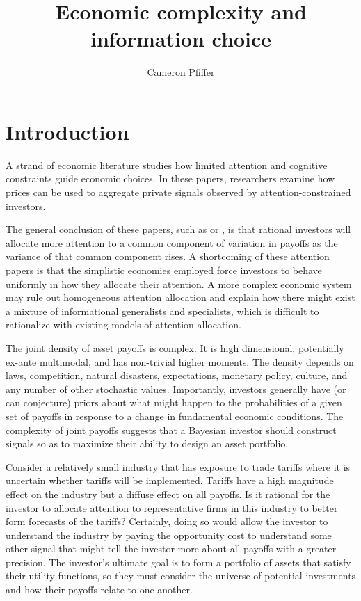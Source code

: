 \documentclass{article}
\title{Economic complexity and information choice}
\author{Cameron Pfiffer}
\begin{document}
\newcommand{\Gauss}{\mathcal{N}}
\newcommand{\Var}{\text{Var}}
\newcommand{\E}{\text{E}}
\newcommand{\argmax}{\text{argmax}}

\newtheorem{definition}{Definition}
\newtheorem{lemma}{Lemma}


\newpage

\maketitle

\section{Introduction}

A strand of economic literature studies how limited attention and cognitive constraints guide economic choices. In these papers, researchers examine how prices can be used to aggregate private signals observed by attention-constrained investors. 

The general conclusion of these papers, such as \textcite{kacperczyk_rational_2016} or \textcite{peng_investor_2006}, is that rational investors will allocate more attention to a common component of variation in payoffs as the variance of that common component rises. A shortcoming of these attention papers is that the simplistic economies employed force investors to behave uniformly in how they allocate their attention. A more complex economic system may rule out homogeneous attention allocation and explain how there might exist a mixture of informational generalists and specialists, which is difficult to rationalize with existing models of attention allocation.

The joint density of asset payoffs is complex. It is high dimensional, potentially ex-ante multimodal, and has non-trivial higher moments. The density depends on laws, competition, natural disasters, expectations, monetary policy, culture, and any number of other stochastic values. Importantly, investors generally have (or can conjecture) priors about what might happen to the probabilities of a given set of payoffs in response to a change in fundamental economic conditions. The complexity of joint payoffs suggests that a Bayesian investor  should construct signals so as to maximize their ability to design an asset portfolio.

Consider a relatively small industry that has exposure to trade tariffs where it is uncertain whether tariffs will be implemented. Tariffs have a high magnitude effect on the industry but a diffuse effect on all payoffs. Is it rational for the investor to allocate attention to representative firms in this industry to better form forecasts of the tariffs? Certainly, doing so would allow the investor to understand the industry by paying the opportunity cost to understand some other signal that might tell the investor more about all payoffs with a greater precision. The investor's ultimate goal is to form a portfolio of assets that satisfy their utility functions, so they must consider the universe of potential investments and how their payoffs relate to one another.
\end{document}
